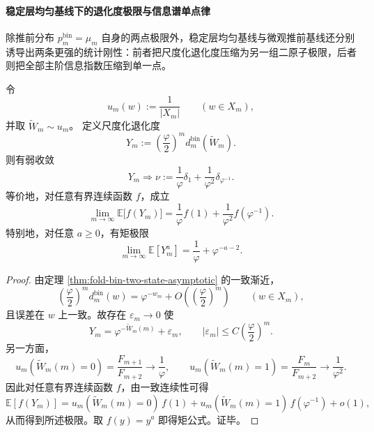 \paragraph{稳定层均匀基线下的退化度极限与信息谱单点律}
除推前分布 \(p_m^{\mathrm{bin}}=\mu_m\) 自身的两点极限外，稳定层均匀基线与微观推前基线还分别诱导出两条更强的统计刚性：前者把尺度化退化度压缩为另一组二原子极限，后者则把全部主阶信息指数压缩到单一点。

\begin{theorem}\label{thm:xi-foldbin-uniform-layer-degeneracy-two-atom-law}
令
\[
u_m(w):=\frac{1}{|X_m|}\qquad (w\in X_m),
\]
并取 \(\widetilde W_m\sim u_m\)。
定义尺度化退化度
\[
Y_m:=\left(\frac{\varphi}{2}\right)^m d_m^{\mathrm{bin}}(\widetilde W_m).
\]
则有弱收敛
\[
Y_m\Longrightarrow \nu
:=
\frac{1}{\varphi}\delta_{1}
+\frac{1}{\varphi^2}\delta_{\varphi^{-1}}.
\]
等价地，对任意有界连续函数 \(f\)，成立
\[
\lim_{m\to\infty}\mathbb E\bigl[f(Y_m)\bigr]
=
\frac{1}{\varphi}f(1)+\frac{1}{\varphi^2}f(\varphi^{-1}).
\]
特别地，对任意 \(a\ge 0\)，有矩极限
\[
\lim_{m\to\infty}\mathbb E[Y_m^a]
=
\frac{1}{\varphi}+\varphi^{-a-2}.
\]
\end{theorem}
\begin{proof}
由定理 \ref{thm:fold-bin-two-state-asymptotic} 的一致渐近，
\[
\left(\frac{\varphi}{2}\right)^m d_m^{\mathrm{bin}}(w)
=
\varphi^{-w_m}+O\!\left(\left(\frac{\varphi}{2}\right)^m\right)
\qquad (w\in X_m),
\]
且误差在 \(w\) 上一致。故存在 \(\varepsilon_m\to 0\) 使
\[
Y_m=\varphi^{-\widetilde W_m(m)}+\varepsilon_m,
\qquad
|\varepsilon_m|\le C\left(\frac{\varphi}{2}\right)^m.
\]
另一方面，
\[
u_m(\widetilde W_m(m)=0)=\frac{F_{m+1}}{F_{m+2}}\to\frac{1}{\varphi},
\qquad
u_m(\widetilde W_m(m)=1)=\frac{F_m}{F_{m+2}}\to\frac{1}{\varphi^2}.
\]
因此对任意有界连续函数 \(f\)，由一致连续性可得
\[
\mathbb E[f(Y_m)]
=
u_m(\widetilde W_m(m)=0)\,f(1)
+u_m(\widetilde W_m(m)=1)\,f(\varphi^{-1})
+o(1),
\]
从而得到所述极限。取 \(f(y)=y^a\) 即得矩公式。证毕。
\end{proof}

